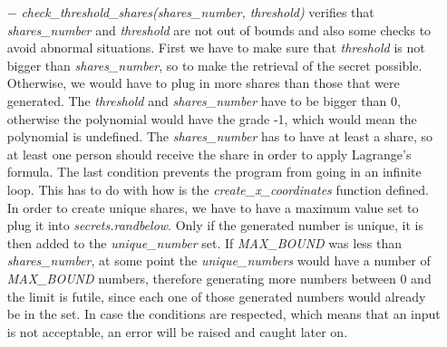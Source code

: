 \documentclass[12pt, a4paper, oneside]{book}
\begin{document}
    \begin{itemize}
        \item[$-$] {\it check\_threshold\_shares(shares\_number, threshold)} verifies that {\it shares\_number} and {\it threshold} are not out of bounds and also some checks to avoid abnormal situations. First we have to make sure that {\it threshold} is not bigger than {\it shares\_number}, so to make the retrieval of the secret possible. Otherwise, we would have to plug in more shares than those that were generated. The {\it threshold} and {\it shares\_number }have to be bigger than 0, otherwise the polynomial would have the grade -1, which would mean the polynomial is undefined. The {\it shares\_number} has to have at least a share, so at least one person should receive the share in order to apply Lagrange's formula. The last condition prevents the program from going in an infinite loop. This has to do with how is the {\it create\_x\_coordinates} function defined. In order to create unique shares, we have to have a maximum value set to plug it into {\it secrets.randbelow}. Only if the generated number is unique, it is then added to the {\it unique\_number} set. If {\it MAX\_BOUND} was less than {\it shares\_number}, at some point the {\it unique\_numbers} would have a number of {\it MAX\_BOUND} numbers, therefore generating more numbers between 0 and the limit is futile, since each one of those generated numbers would already be in the set. In case the conditions are respected, which means that an input is not acceptable, an error will be raised and caught later on.
    \end{itemize}
    
\end{document}
